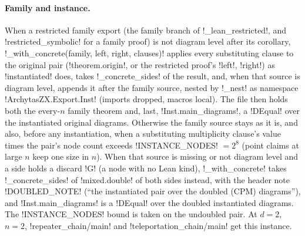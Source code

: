 \paragraph{Family and instance.} When a restricted family export (the family branch of \py!_lean_restricted!, and \py!restricted_symbolic! for a family proof) is not diagram level after its corollary, \py!_with_concrete(family, left, right, clauses)! applies every substituting clause to the original pair (\py!theorem.origin!, or the restricted proof's \py!left!, \py!right!) as \py!instantiated! does, takes \py!_concrete_sides! of the result, and, when that source is diagram level, appends it after the family source, nested by \py!_nest! as namespace \code!ArchytasZX.Export.Inst! (imports dropped, macros local). The file then holds both the every-$n$ family theorem and, last, \code!Inst.main_diagrams!, a \lean!DEqual! over the instantiated original diagrams. Otherwise the family source stays as it is, and also, before any instantiation, when a substituting multiplicity clause's value times the pair's node count exceeds \py!INSTANCE_NODES! $=2^8$ (point claims at large $n$ keep one size in $n$). When that source is missing or not diagram level and a side holds a discard \code!G! (a node with no Lean kind), \py!_with_concrete! takes \py!_concrete_sides! of \py!mixed.double! of both sides instead, with the header note \py!DOUBLED_NOTE! (``the instantiated pair over the doubled (CPM) diagrams''), and \code!Inst.main_diagrams! is a \lean!DEqual! over the doubled instantiated diagrams. The \py!INSTANCE_NODES! bound is taken on the undoubled pair. At $d=2$, $n=2$, \code!repeater_chain/main! and \code!teleportation_chain/main! get this instance.
\par\endgroup
